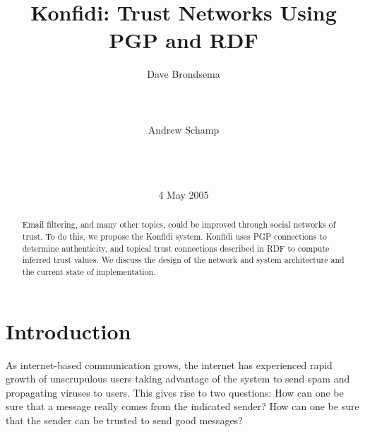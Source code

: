 \documentclass[letterpaper]{www2006-submission}
\begin{document}

\title{Konfidi: Trust Networks Using PGP and RDF}


\author{
\alignauthor Dave Brondsema\\
       \\
       \\
       \\
\alignauthor Andrew Schamp\\
       \\
       \\
       \\
}

\date{4 May 2005}

\maketitle
\begin{abstract}
Email filtering, and many other topics, could be improved through social networks of trust.  To do this, we propose the Konfidi system.  Konfidi uses PGP connections to determine authenticity, and topical trust connections described in RDF to compute inferred trust values.  We discuss the design of the network and system architecture and the current state of implementation.
\end{abstract}


\section{Introduction}
As internet-based communication grows, the internet has experienced rapid growth of unscrupulous users taking advantage of the system to send spam and propagating viruses to users.  This gives rise to two questions: 
How can one be sure that a message really comes from the indicated sender?  How can one be sure that the sender can be trusted to send good messages?
\end{document}
